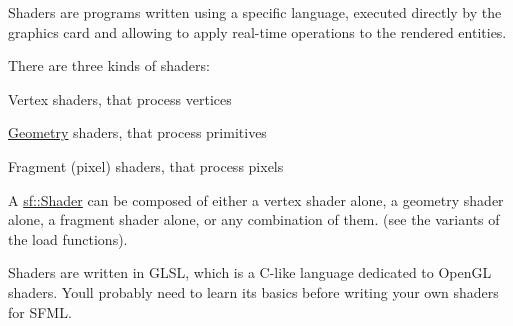 Shaders are programs written using a specific language, executed directly by the graphics card and allowing to apply real-\/time operations to the rendered entities.

There are three kinds of shaders\+: \begin{DoxyItemize}
\item Vertex shaders, that process vertices \item \hyperlink{class_geometry}{Geometry} shaders, that process primitives \item Fragment (pixel) shaders, that process pixels\end{DoxyItemize}
A \hyperlink{classsf_1_1_shader}{sf\+::\+Shader} can be composed of either a vertex shader alone, a geometry shader alone, a fragment shader alone, or any combination of them. (see the variants of the load functions).

Shaders are written in G\+L\+SL, which is a C-\/like language dedicated to Open\+GL shaders. You\textquotesingle{}ll probably need to learn its basics before writing your own shaders for S\+F\+ML.

